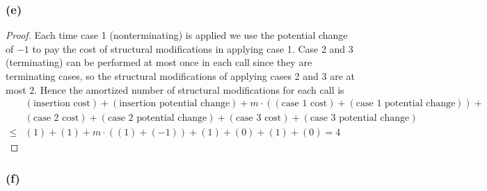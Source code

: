 \subsubsection*{(e)}

\begin{proof}
    Each time case 1 (nonterminating) is applied
    we use the potential change of $-1$ to 
    pay the cost of structural modifications in applying case 1.
    Case 2 and 3 (terminating) can be performed at most once 
    in each call since they are terminating cases,
    so the structural modifications of applying cases 2 and 3 are at most $2$.
    Hence the amortized number of structural modifications for each call is
    \begin{equation*}
    \begin{split}
        & (\text{insertion cost}) + (\text{insertion potential change}) + 
        m \cdot ((\text{case 1 cost}) + (\text{case 1 potential change})) + \\
        & (\text{case 2 cost}) + (\text{case 2 potential change}) + 
        (\text{case 3 cost}) + (\text{case 3 potential change}) \\
        \leq & (1) + (1) + m \cdot ((1) + (-1)) + (1) + (0) + (1) + (0)
        = 4
    \end{split}
    \end{equation*}
\end{proof}

\subsubsection*{(f)}

